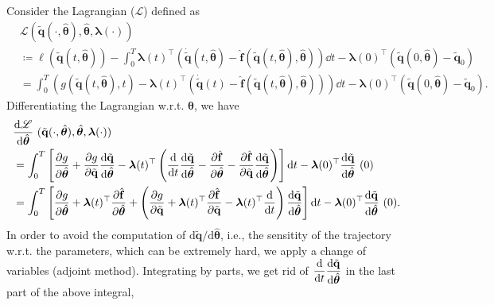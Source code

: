 Consider the  Lagrangian ($\mathscr{L}$) defined as\\
\begin{align*}
    &\mathscr{L}(\tilde{\mathbf{q}}(\cdot,\hat{\bm{\theta}}),\hat{\bm{\theta}},\bm{\lambda}(\cdot))\\
    &\coloneqq \ell(\tilde{\mathbf{q}}(t,\hat{\bm{\theta}})) - \int_0^T \bm{\lambda}(t)^{\top}\left( \dot{\tilde{\mathbf{q}}}(t,\hat{\bm{\theta}}) - \hat{\mathbf{f}}(\tilde{\mathbf{q}}(t,\hat{\bm{\theta}}),\hat{\bm{\theta}})  \right)\dd t -\bm{\lambda}(0)^{\top}(\tilde{\mathbf{q}}(0,\hat{\bm{\theta}})-\tilde{\mathbf{q}}_0)\\
    &= \int_0^T \left( g(\tilde{\mathbf{q}}(t,\hat{\bm{\theta}}),t) - \bm{\lambda}(t)^{\top}\left( \dot{\tilde{\mathbf{q}}}(t) - \hat{\mathbf{f}}(\tilde{\mathbf{q}}(t,\hat{\bm{\theta}}),\hat{\bm{\theta}})  \right) \right)\dd t-\bm{\lambda}(0)^{\top}(\tilde{\mathbf{q}}(0,\hat{\bm{\theta}})-\tilde{\mathbf{q}}_0).
\end{align*}
Differentiating the Lagrangian w.r.t. $\hat{\bm{\theta}}$, we have\\
\begin{align*}
    &\dv{\mathscr{L}}{\hat{\bm{\theta}}}~(\tilde{\mathbf{q}}(\cdot,\hat{\bm{\theta}}),\hat{\bm{\theta}},\bm{\lambda}(\cdot)) \\
    &= \int_0^T\left[ \pdv{g}{\hat{\bm{\theta}}} + \pdv{g}{\tilde{\mathbf{q}}} \dv{\tilde{\mathbf{q}}}{\hat{\bm{\theta}}} - \bm{\lambda}(t)^{\top} \left( \dv{t}\dv{\tilde{\mathbf{q}}}{\hat{\bm{\theta}}} - \pdv{\hat{\mathbf{f}}}{\hat{\bm{\theta}}} - \pdv{\hat{\mathbf{f}}}{\tilde{\mathbf{q}}}\dv{\tilde{\mathbf{q}}}{\hat{\bm{\theta}}} \right) \right]\dd t - \bm{\lambda}(0)^{\top}\dv{\tilde{\mathbf{q}}}{\hat{\bm{\theta}}}~(0)\notag\\
    &= \int_0^T \left[\pdv{g}{\hat{\bm{\theta}}} + \bm{\lambda}(t)^{\top} \pdv{\hat{\mathbf{f}}}{\hat{\bm{\theta}}}+ \left( \pdv{g}{\tilde{\mathbf{q}}} + \bm{\lambda}(t)^{\top}\pdv{\hat{\mathbf{f}}}{\tilde{\mathbf{q}}}-\bm{\lambda}(t)^{\top}\dv{t} \right)\dv{\tilde{\mathbf{q}}}{\hat{\bm{\theta}}} \right]\dd t- \bm{\lambda}(0)^{\top}\dv{\tilde{\mathbf{q}}}{\hat{\bm{\theta}}}~(0). 
\end{align*}
In order to avoid the computation of $\mathrm{d}{\tilde{\mathbf{q}}}/\mathrm{d}{\hat{\bm{\theta}}}$, i.e., the sensitity of the trajectory w.r.t. the parameters, which can be extremely hard, we apply a change of variables (adjoint method). Integrating by parts, we get rid of $\displaystyle\dv{t}\dv{\tilde{\mathbf{q}}}{\hat{\bm{\theta}}}$ in the last part of the above integral,\\
